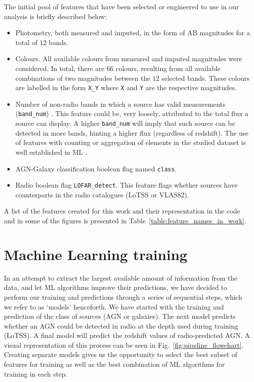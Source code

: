 \documentclass{aa}
\begin{document}
The initial pool of features that have been selected or engineered to use in our analysis is briefly described below:

\begin{itemize}
    \item Photometry, both measured and imputed, in the form of AB magnitudes for a total of $12$ bands.
    
    \item Colours. All available colours from measured and imputed magnitudes were considered. In total, there are $66$ colours, resulting from all available combinations of two magnitudes between the $12$ selected bands. These colours are labelled in the form \verb|X_Y| where \verb|X| and \verb|Y| are the respective magnitudes.

    \item Number of non-radio bands in which a source has valid measurements (\verb|band_num|) . This feature could be, very loosely, attributed to the total flux a source can display. A higher \verb|band_num| will imply that such source can be detected in more bands, hinting a higher flux (regardless of redshift). The use of features with counting or aggregation of elements in the studied dataset is well established in ML \citep[see, for example,][]{zheng2018feature, duboue2020art, 2021AJ....161..141S, 2022arXiv220913074H}.
    
    \item AGN-Galaxy classification boolean flag named \verb|class|.
    
    \item Radio boolean flag \verb|LOFAR_detect|. This feature flags whether sources have counterparts in the radio catalogues (LoTSS or VLAS82).
\end{itemize}

A list of the features created for this work and their representation in the code and in some of the figures is presented in Table~\ref{table:feature_names_in_work}.

\section{Machine Learning training}\label{sec:ML_training}

In an attempt to extract the largest available amount of information from the data, and let ML algorithms improve their predictions, we have decided to perform our training and predictions through a series of sequential steps, which we refer to as `models' henceforth. We have started with the training and prediction of the class of sources (AGN or galaxies). The next model predicts whether an AGN could be detected in radio at the depth used during training (LoTSS). A final model will predict the redshift values of radio-predicted AGN. A visual representation of this process can be seen in Fig.~\ref{fig:pipeline_flowchart}. Creating separate models gives us the opportunity to select the best subset of features for training as well as the best combination of ML algorithms for training in each step.
\end{document}
